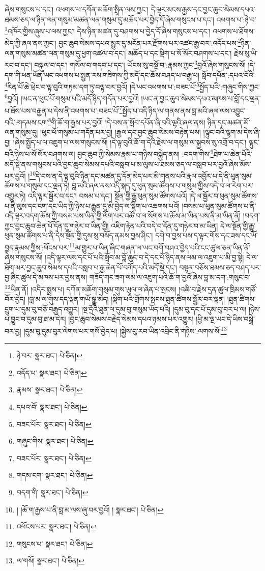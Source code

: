 ཞེས་གསུངས་པ་དང་། འཕགས་པ་དཀོན་མཆོག་སྤྲིན་ལས་ཀྱང་། དེ་ལྟར་སངས་རྒྱས་དང་བྱང་ཆུབ་སེམས་དཔའ་ཐམས་ཅད་ལ་ཉིན་ལན་གསུམ་མཚན་ལན་གསུམ་དུ་མཆོད་པར་བྱེད་དོ་ཞེས་གསུངས་པ་དང་། འཕགས་པ་:ཉེ་བ་\footnote{ཉེ་བར་  སྣར་ཐང་།  པེ་ཅིན། }འཁོར་གྱིས་ཞུས་པ་ལས་ཀྱང་། དེས་ཉིན་མཚན་དུ་བཤགས་པ་བྱེད་དོ་ཞེས་གསུངས་པ་དང་། འཕགས་པ་ཐོགས་མེད་ཀྱི་ཞལ་ནས་ཀྱང་། བྱང་ཆུབ་སེམས་དཔའ་མྱུར་དུ་མངོན་པར་རྫོགས་པར་འཚང་རྒྱ་བར་:འདོད་པས་\footnote{འདོད་པ་  སྣར་ཐང་།  པེ་ཅིན། }ཉིན་ལན་གསུམ་མཚན་ལན་གསུམ་དུ་ཕྱག་འཚལ་བ་དང་། མཆོད་པ་དང་སྡིག་པ་སོ་སོར་བཤགས་པ་དང་། རྗེས་སུ་ཡི་རང་བ་དང་། བསྐུལ་བ་དང་། གསོལ་བ་གདབ་པ་དང་། ཡོངས་སུ་བསྔོ་བ་:རྣམས་ཀྱང་\footnote{རྣམས་  སྣར་ཐང་།  པེ་ཅིན། }བྱའོ་ཞེས་གསུངས་སོ། །དེ་དག་གི་ཕན་ཡོན་ཡང་འཕགས་པ་སྤྱན་རས་གཟིགས་ཀྱི་མདོ་དང་ཆོས་བཤད་པ་བརྒྱ་པ། སློབ་དཔོན་:དཔའ་བོའི་\footnote{དཔའ་བོ་  སྣར་ཐང་།  པེ་ཅིན། }རིན་པོ་ཆེ་ཕྲེང་བ་ལྟ་བུའི་གཏམ་དག་ཏུ་བལྟ་བར་བྱའོ། །དེ་ཡང་འཕགས་པ་:བཟང་པོ་\footnote{བཟང་པོར་  སྣར་ཐང་།  པེ་ཅིན། }སྤྱོད་པའི་:གཞུང་གིས་ཀྱང་\footnote{གཞུང་གིས་  སྣར་ཐང་།  པེ་ཅིན། }བྱའོ། །ཡང་ན་ཕུང་པོ་གསུམ་པའི་མདོ་ཉིད་གདོན་པར་བྱའོ། །ཡང་ན་བྱང་ཆུབ་སེམས་དཔའ་མཁས་པ་བློ་དང་ལྡན་པ་ཐོས་པས་བརྒྱན་པ་དེས་ནི་འཕགས་པ་:བཟང་པོ་\footnote{བཟང་པོར་  སྣར་ཐང་།  པེ་ཅིན། }སྤྱོད་པ་འདི་ཉིད་ལ་གནས་ནས་བླ་མའི་ཞལ་ལས་འབྱུང་བའི་:གདམས་ངག་\footnote{གདམ་ངག་  སྣར་ཐང་།  པེ་ཅིན། }གི་ཆོ་ག་རྒྱས་པར་བྱའོ། །དེ་བས་ན་སློབ་དཔོན་ཞི་བའི་ལྷའི་ཞལ་ནས། ཉིན་དང་མཚན་མོ་ལན་གསུམ་དུ། །ཕུང་པོ་གསུམ་པ་གདོན་པར་བྱ། །རྒྱལ་དང་བྱང་ཆུབ་སེམས་བརྟེན་པས། །ལྟུང་བའི་ལྷག་མ་དེས་ཞི་བྱ། །ཞེས་སྤྱོད་པ་ལ་འཇུག་པ་ལས་གསུངས་སོ། །དེ་ལྟ་བུའི་ཆོ་ག་དེའི་རྗེས་ལ་གསུམ་ལ་སྐྱབས་སུ་འགྲོ་བ་དང་། ལྟུང་བའི་ཉེས་པ་སོ་སོར་བཤགས་ལ། བྱང་ཆུབ་ཀྱི་སེམས་རྣམ་པ་གཉིས་བསྐྱེད་ནས། :བདག་གིས་\footnote{བདག་གི་  སྣར་ཐང་།  པེ་ཅིན། }ཐེག་པ་ཆེན་པོའི་མདོ་སྡེ་ནས་གསུངས་པའི་བྱང་ཆུབ་སེམས་དཔའི་བསླབ་པ་མ་ལུས་པ་ཐམས་ཅད་ལ་བསླབ་པར་བྱའོ་ཞེས་མོས་པར་བྱའོ། །\footnote{། །ཆོ་ག་རྒྱས་པ་ནི་བླ་མ་ལས་ཞུ་བར་བྱའོ། །  སྣར་ཐང་།  པེ་ཅིན། }དེ་བས་ན་དེ་ལྟ་བུའི་ཉིན་དང་མཚན་དུ་དོན་མེད་པར་མི་གནས་པའི་རྣལ་འབྱོར་པ་དེ་ནི་ཕུན་སུམ་ཚོགས་པ་གསུམ་དང་ལྡན་ཏེ། བླ་མའི་ཞལ་ནས་འདི་སྐད་དུ་ཕུན་སུམ་ཚོགས་པ་གསུམ་གྱིས་བདེ་བ་ལ་རེག་པར་འགྱུར་ཏེ། འདི་ལྟར་སྦྱོར་བ་དང་། བསམ་པ་དང་། སྔོན་གྱི་རྒྱུ་ཕུན་སུམ་ཚོགས་པའོ། །དེ་ལ་སྦྱོར་བ་ཕུན་སུམ་ཚོགས་པ་ནི་ལུས་དང་ངག་དང་ཡིད་ཀྱི་ཉེས་པ་རྒྱུན་དུ་མི་བྱེད་ལ་སྡིག་པ་འཆགས་པའོ། །བསམ་པ་ཕུན་སུམ་ཚོགས་པ་ནི་འདི་ལྟར་བདག་ཆོས་ཀྱི་བསམ་པས་ཡིན་གྱི་ལོག་པར་འཚོ་བ་ལ་སོགས་པ་ཆོས་མ་ཡིན་པས་ནི་མ་ཡིན་ནོ། །བདག་ཀྱང་བྱང་ཆུབ་ཆེན་པོ་དོན་དུ་གཉེར་བ་ཡིན་གྱི། འཇིག་རྟེན་པའི་བདེ་བ་དོན་དུ་གཉེར་བ་མ་ཡིན། དེ་ལ་སྔོན་གྱི་རྒྱུ་ཕུན་སུམ་ཚོགས་པ་ནི་དེས་སྔོན་གྱི་དུས་སུ་བསོད་ནམས་བྱས་ཤིང་། དགེ་བ་བྱས་པས་ད་ལྟར་གོས་དང་ཟས་དང་ཡོ་བྱད་རྣམས་ཀྱིས་:ཕོངས་པར་\footnote{འཕོངས་པར་  སྣར་ཐང་།  པེ་ཅིན། }མ་གྱུར་པ་ཡིན་ཞིང་གཞན་ལ་ཡང་བགོ་བཤའ་བྱེད་པའི་ངང་ཚུལ་ཅན་ཡིན་ནོ་ཞེས་གསུངས་སོ། །འདི་ལྟར་ལས་དང་པོ་པའི་སློབ་མ་བློ་ཆུང་བ་དེ་དང་པོ་ཉིད་ནས་ལམ་ལ་འཇུག་པ་མི་བྱ་སྟེ། དེ་ལ་ཐོག་མར་བྱང་ཆུབ་སེམས་དཔའི་བསླབ་པ་རྒྱ་ཆེན་པོ་བཀོད་པའི་མདོ་སྡེ་དང་། བསྟན་བཅོས་ཐམས་ཅད་བཤད་པར་བྱ་ཞིང་ཚུལ་དེ་མཁས་པར་བྱས་ནས། གཟོད་གང་ཟག་ལམ་ལ་འཇུག་པའི་ཆོ་ག་བྱའོ་ཞེས་བླ་མ་དག་:གསུང་བ་\footnote{གསུངས་པ་  སྣར་ཐང་།  པེ་ཅིན། }ཡིན་ནོ། །འདིར་སྨྲས་པ། དཀོན་མཆོག་གསུམ་གུས་ཡུལ་ལ་ཞེན་པ་སྤངས། །འཆི་བ་རྗེས་དྲན་ཚུལ་ཁྲིམས་གཙོ་བོར་བྱེད། །བླ་མ་ལ་གུས་དད་ལྡན་གཡོ་སྒྱུ་མེད། །སྡིག་པའི་གྲོགས་སྤངས་ཐུན་ཚིགས་སྦྱོར་བར་ལྡན། །ཐུན་ཚིགས་དྲུག་པ་དུམ་བུ་བཅོ་བརྒྱད་འགྱུར། །སྔ་དྲོའི་ཐུན་ལ་དུམ་བུ་གསུམ་ཡོད་པའི། །དུམ་བུ་དང་པོ་དུམ་བུ་བར་པ་ལ། །ཉེས་པ་བྱུང་བ་དུམ་བུ་ཐ་མ་དེར། །བྱང་ཆུབ་སེམས་བརྗེད་སེམས་དཔའ་ཉམས་པར་འགྱུར། །ཕྱི་མ་ལྔ་ཡང་དེ་ཡིས་བསྒྲེ་བར་བྱ། །དུམ་བུ་དུམ་བུར་ལེགས་པར་གསོ་བྱེད་པ། །སྐྱེས་བུ་རབ་ཡིན་འབྲིང་ནི་གཉིས་:ལགས་སོ།\footnote{ལ་གསོ།  སྣར་ཐང་།  པེ་ཅིན། } 